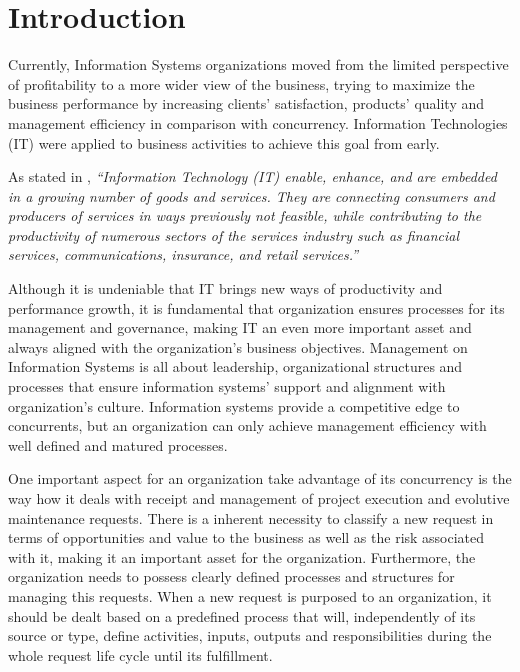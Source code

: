 
% 
% 

\section{Introduction}


Currently, Information Systems organizations moved from the limited perspective of profitability to a more wider view of the business, trying to maximize the business performance by increasing clients' satisfaction, products' quality and management efficiency in comparison with concurrency. Information Technologies (IT) were applied to business activities to achieve this goal from early.\par 
As stated in \cite{itilSS}, \textit{``Information Technology (IT) enable, enhance, and are embedded in a growing number of goods and services. They are connecting consumers and producers of services in ways previously not feasible, while contributing to the productivity of numerous sectors of the services industry such as financial services, communications, insurance, and retail services.''}\par
Although it is undeniable that IT brings new ways of productivity and performance growth, it is fundamental that organization ensures processes for its management and governance, making IT an even more important asset and always aligned with the organization's business objectives. Management on Information Systems is all about leadership, organizational structures and processes that ensure information systems' support and alignment with organization's culture. Information systems provide a competitive edge to concurrents, but an organization can only achieve management efficiency with well defined and matured processes.\par
One important aspect for an organization take advantage of its concurrency is the way how it deals with receipt and management of project execution and evolutive maintenance requests. There is a inherent necessity to classify a new request in terms of opportunities  and value to the business as well as the risk associated with it, making it an important asset for the organization. Furthermore, the organization needs to possess clearly defined processes and structures for managing this requests. When a new request is purposed to an organization, it should be dealt based on a predefined process that will, independently of its source or type, define activities, inputs, outputs and responsibilities during the whole request life cycle until its fulfillment. \par
